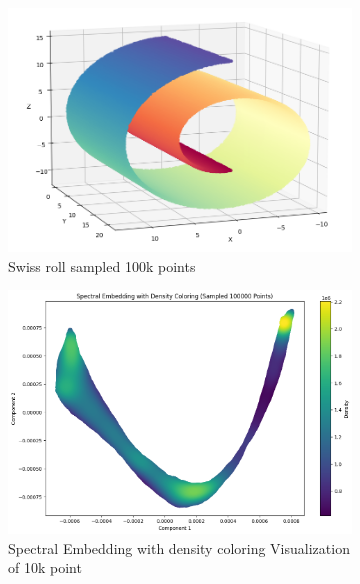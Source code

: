 \begin{itemize}
\begin{itemize}
                \begin{figure}[H]
                    \centering
                    \begin{subfigure}{0.45\textwidth}
                        \includegraphics[width=\linewidth]{images/sklearn (5).png}
                        \caption{Swiss roll sampled 100k points}
                        \label{fig:sklearn_SwissRoll_100k}
                    \end{subfigure} 
                    \begin{subfigure}{0.45\textwidth}
                        \includegraphics[width=\linewidth]{images/sklearn (7).png}
                        \caption{Spectral Embedding with density coloring Visualization of 10k point}
                        \label{fig:sklearn_SwissRoll_100k_R2}
                    \end{subfigure}
                    \caption{}
                    \label{fig:data_dol2}
               \end{figure}
           

\end{itemize}
\end{itemize}
